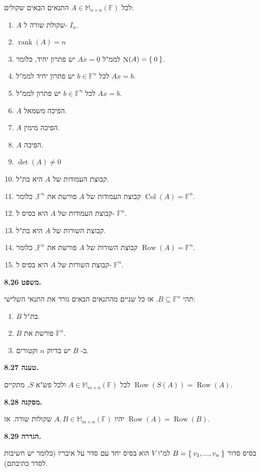 \documentclass[12pt]{report}
\theoremstyle{plain}
\theoremstyle{definition}
\newcommand{\F}{\mathbb{F}}
\DeclareMathOperator{\rank}{rank}
\newcommand{\M}{\mathbb{M}}
\newcommand{\0}{\mathbf{0}}
\DeclareMathOperator{\Row}{Row}
\DeclareMathOperator{\Col}{Col}
\DeclareMathOperator{\Null}{N}
\begin{document}
לכל
$A\in\M_{n\times n}(\F)$
התנאים הבאים שקולים:
\begin{enumerate}[label=(\alph*)]
\item 
$A$
שקולת שורה ל-
$I_n$.
\item 
$\rank(A)=n$
\item 
לממ"ל
$Ax=\underline{0}$
יש פתרון יחיד, כלומר
$\Null(A)=\Set{0}$.
\item 
לכל
$b\in\F^n$
יש פתרון יחיד לממ"ל
$Ax=b$.
\item
לכל
$b\in\F^n$
יש פתרון לממ"ל
$Ax=b$.
\item 
$A$
הפיכה משמאל.
\item 
$A$
הפיכה מימין.
\item 
$A$
הפיכה.
\item 
$\det(A)\neq 0$
\item 
קבוצת העמודות של 
$A$
היא בת"ל.
\item 
קבוצת העמודות של 
$A$
פורשת את
$\F^n$,
כלומר
$\Col(A)=\F^n$.
\item 
קבוצת העמודות של 
$A$
היא בסיס ל-
$\F^n$.
\item 
קבוצת השורות של 
$A$
היא בת"ל.
\item 
קבוצת השורות של 
$A$
פורשת את
$\F^n$,
כלומר
$\Row(A)=\F^n$.
\item 
קבוצת השורות של 
$A$
היא בסיס ל-
$\F^n$.
\end{enumerate}
\bigskip
\bigskip

\noindent\textbf{משפט 8.26.}

תהי
$B\subseteq\F^n$.
אז כל שניים מהתנאים הבאים גורר את התנאי השלישי:
\begin{enumerate}[label=(\alph*)]
\item
$B$
בת"ל.
\item
$B$
פורשת את
$\F^n$.
\item
ב-
$B$
יש בדיוק
$n$ 
וקטורים.
\end{enumerate}
\bigskip
\bigskip

\noindent\textbf{טענה 8.27.}

לכל
$A\in\M_{m\times n}(\F)$
ולכל פש"א
$S$,
מתקיים
$\Row(S(A))=\Row(A)$.
\bigskip
\bigskip

\noindent\textbf{מסקנה 8.28.}

יהיו
$A,B\in\M_{m\times n}(\F)$
שקולות שורה. אז 
$\Row(A)=\Row(B)$.
\bigskip
\bigskip

\noindent\textbf{הגדרה 8.29.}

בסיס סדור 
$B=\Set{v_1,...,v_n}$
למ"ו
$V$
הוא בסיס יחד עם סדר על איבריו (כלומר יש חשיבות לסדר כתיבתם).
\bigskip
\bigskip
\end{document}
